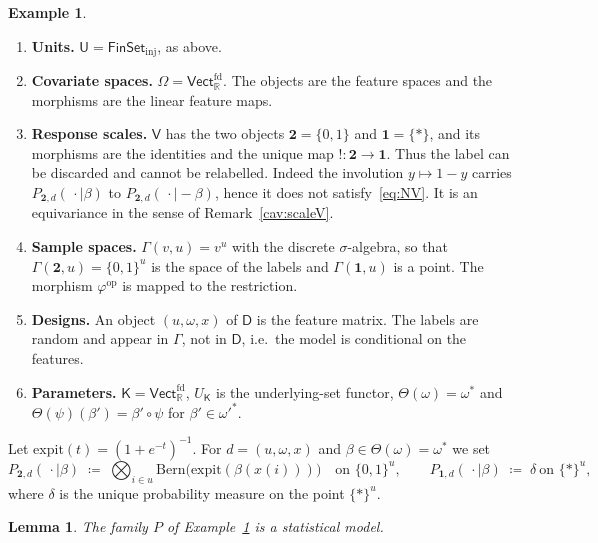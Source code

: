 \documentclass[11pt,a4paper]{article}
\theoremstyle{plain}
\newtheorem{lemma}[theorem]{Lemma}
\theoremstyle{definition}
\newtheorem{example}[theorem]{Example}
\theoremstyle{remark}
\newcommand{\cat}[1]{\mathsf{#1}}
\newcommand{\catU}{\cat{U}}
\newcommand{\catV}{\cat{V}}
\newcommand{\catO}{\cat{\Omega}}
\newcommand{\catD}{\cat{D}}
\newcommand{\catK}{\cat{K}}
\newcommand{\FinSet}{\cat{FinSet}}
\newcommand{\op}{\mathrm{op}}
\newcommand{\R}{\mathbb{R}}
\newcommand{\Vect}{\cat{Vect}}
\newcommand{\Bern}{\mathrm{Bern}}
\newcommand{\expit}{\mathrm{expit}}
\begin{document}
\begin{example}\label{ex:logreg}
\leavevmode
\begin{enumerate}
\item \textbf{Units.} $\catU = \FinSet_{\mathrm{inj}}$, as above.

\item \textbf{Covariate spaces.} $\catO = \Vect_{\R}^{\mathrm{fd}}$. The
objects are the feature spaces and the morphisms are the linear feature maps.

\item \textbf{Response scales.} $\catV$ has the two objects
$\mathbf{2}=\{0,1\}$ and $\mathbf{1}=\{*\}$, and its morphisms are the
identities and the unique map $!\colon\mathbf{2}\to\mathbf{1}$. Thus the label
can be discarded and cannot be relabelled. Indeed the involution
$y \mapsto 1-y$ carries $P_{\mathbf{2},d}(\,\cdot\mid\beta)$ to
$P_{\mathbf{2},d}(\,\cdot\mid -\beta)$, hence it does not
satisfy~\eqref{eq:NV}. It is an equivariance in the sense of
Remark~\ref{cav:scaleV}.

\item \textbf{Sample spaces.} $\Gamma(v,u)=v^{u}$ with the discrete
$\sigma$-algebra, so that $\Gamma(\mathbf{2},u)=\{0,1\}^{u}$ is the space of
the labels and $\Gamma(\mathbf{1},u)$ is a point. The morphism $\varphi^{\op}$
is mapped to the restriction.

\item \textbf{Designs.} An object $(u,\omega,x)$ of $\catD$ is the feature
matrix. The labels are random and appear in $\Gamma$, not in $\catD$, i.e.\ the
model is conditional on the features.

\item \textbf{Parameters.} $\catK = \Vect_{\R}^{\mathrm{fd}}$, $U_{\catK}$ is
the underlying-set functor, $\Theta(\omega)=\omega^{*}$ and
$\Theta(\psi)(\beta') = \beta'\circ\psi$ for $\beta' \in \omega'^{*}$.
\end{enumerate}

\noindent Let $\expit(t)=(1+e^{-t})^{-1}$. For $d = (u,\omega,x)$ and
$\beta \in \Theta(\omega) = \omega^{*}$ we set
\[
P_{\mathbf{2},d}(\,\cdot\mid\beta)
\;\coloneqq\; \bigotimes_{i\in u}\Bern\!\bigl(\expit(\beta(x(i)))\bigr)
\quad\text{on }\{0,1\}^{u},
\qquad
P_{\mathbf{1},d}(\,\cdot\mid\beta) \;\coloneqq\; \delta \ \text{on } \{*\}^{u},
\]
where $\delta$ is the unique probability measure on the point $\{*\}^{u}$.
\end{example}

\begin{lemma}\label{lem:logreg-model}
The family $P$ of Example~\ref{ex:logreg} is a statistical model.
\end{lemma}
\end{document}
